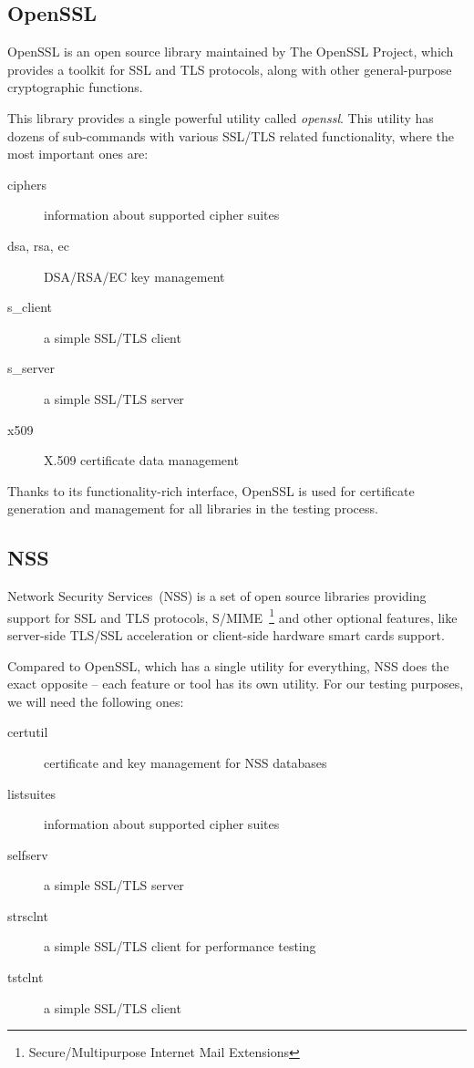 \subsection{OpenSSL}
    OpenSSL is an open source library maintained by The OpenSSL Project,
    which provides a toolkit for SSL and TLS
    protocols, along with other general-purpose cryptographic functions.

    This library provides a single powerful utility called \textit{openssl}. This
    utility has dozens of sub-commands with various SSL/TLS related functionality,
    where the most important ones are:
    \begin{description}
        \item [ciphers] information about supported cipher suites
        \item [dsa, rsa, ec] DSA/RSA/EC key management
        \item [s\_client] a simple SSL/TLS client
        \item [s\_server] a simple SSL/TLS server
        \item [x509] X.509 certificate data management
    \end{description}

    Thanks to its functionality-rich interface, OpenSSL is used for certificate
    generation and management for all libraries in the testing process.

\subsection{NSS}
    Network Security Services~(NSS) is a set of open source libraries providing
    support for SSL and TLS protocols,
    S/MIME~\footnote{Secure/Multipurpose Internet Mail Extensions}
    and other optional features, like
    server-side TLS/SSL acceleration or client-side hardware smart cards support.

    Compared to OpenSSL, which has a single utility for everything, NSS does
    the exact opposite -- each feature or tool has its own utility. For our
    testing purposes, we will need the following ones:
    \begin{description}
        \item [certutil] certificate and key management for NSS databases
        \item [listsuites] information about supported cipher suites
        \item [selfserv] a simple SSL/TLS server
        \item [strsclnt] a simple SSL/TLS client for performance testing
        \item [tstclnt] a simple SSL/TLS client
    \end{description}


